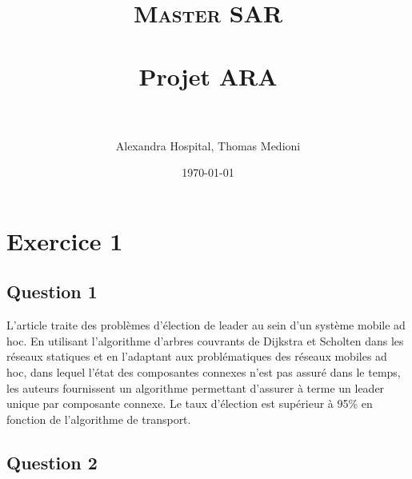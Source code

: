 \documentclass[paper=a4, fontsize=11pt]{article} %
\title{	
\normalfont \normalsize 
\textsc{Master SAR} \\ [25pt] %
\horrule{0.5pt} \\[0.4cm] %
\huge Projet ARA \\ %
\horrule{2pt} \\[0.5cm] %
}
\author{Alexandra Hospital, Thomas Medioni} %
\date{\normalsize\today} %
\begin{document}
\maketitle %

\newpage


\section{Exercice 1}

\subsection{Question 1}

L'article traite des problèmes d'élection de leader au sein d'un système mobile ad hoc. En utilisant l'algorithme d'arbres couvrants de Dijkstra et Scholten dans les réseaux statiques et en l'adaptant aux problématiques des réseaux mobiles ad hoc, dans lequel l'état des composantes connexes n'est pas assuré dans le temps, les auteurs fournissent un algorithme permettant d'assurer à terme un leader unique par composante connexe.
Le taux d'élection est supérieur à 95\% en fonction de l'algorithme de transport.

\subsection{Question 2}
\end{document}
